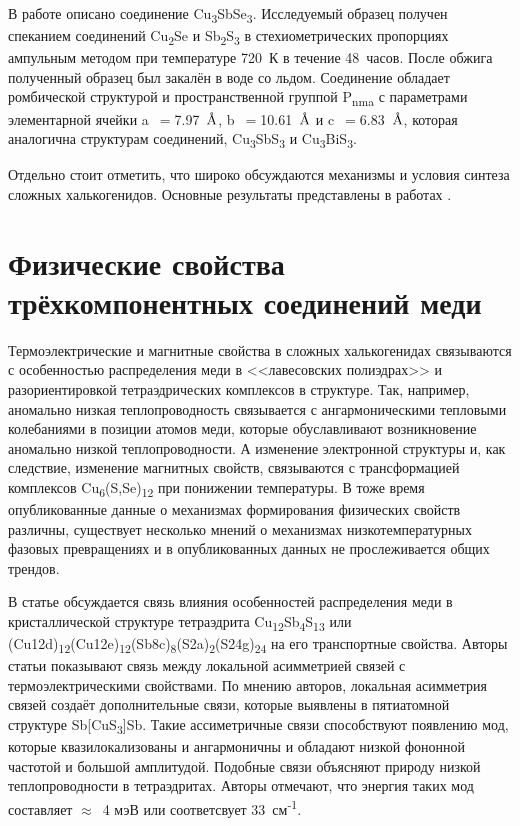 В работе \cite{31_Whitfield_1980} описано соединение Cu\textsubscript{3}SbSe\textsubscript{3}. Исследуемый образец получен спеканием соединений Cu\textsubscript{2}Se и Sb\textsubscript{2}S\textsubscript{3} в стехиометрических пропорциях ампульным методом при температуре 720~К в течение 48~часов. После обжига полученный образец был закалён в воде со льдом. Соединение обладает ромбической структурой и пространственной группой P\textsubscript{nma} с параметрами элементарной ячейки a~$=$7.97~$\mbox{\normalfont\AA}$, b~$=$10.61~$\mbox{\normalfont\AA}$ и c~$=$6.83~$\mbox{\normalfont\AA}$, которая аналогична структурам соединений,  Cu\textsubscript{3}SbS\textsubscript{3} и  Cu\textsubscript{3}BiS\textsubscript{3}.


Отдельно стоит отметить, что широко обсуждаются механизмы и условия синтеза сложных халькогенидов. Основные результаты представлены в работах \cite{Sis_Frost2002,sis_karup59new,sis_Mueller2002,sis_Mueller2003,sis_Raghavan2004,sis_seal1990tetrahedrite,sis_Skinner1972,sis_Taras_Bryndzia_1988,sis_Tomkins2006,sis1_1347-4065-8-4-443,sis1_BALAZ1995375,sis1_Braga2008,sis1_Pfitzner:se0205,sis1_WELLER2017794}.
\newpage


\section{Физические свойства трёхкомпонентных соединений меди} \label{sect1_3}

Термоэлектрические и магнитные свойства в сложных халькогенидах связываются с особенностью распределения меди в <<лавесовских полиэдрах>>  и разориентировкой тетраэдрических комплексов в структуре. Так, например, аномально низкая теплопроводность связывается с ангармоническими тепловыми колебаниями в позиции атомов меди\cite{Mishra2017}, которые обуславливают возникновение аномально низкой теплопроводности. А изменение электронной структуры и, как следствие, изменение магнитных свойств, связываются с трансформацией комплексов  Cu\textsubscript{6}(S,Se)\textsubscript{12} при понижении температуры\cite{Gainov2008}. В тоже время опубликованные данные о механизмах формирования физических свойств различны, существует несколько мнений о механизмах низкотемпературных фазовых превращениях и в опубликованных данных не прослеживается общих трендов.


В статье \cite{Lai_2015} обсуждается связь влияния особенностей распределения меди в кристаллической структуре тетраэдрита Cu\textsubscript{12}Sb\textsubscript{4}S\textsubscript{13} или (Cu12d)\textsubscript{12}(Cu12e)\textsubscript{12}(Sb8c)\textsubscript{8}(S2a)\textsubscript{2}(S24g)\textsubscript{24} на его транспортные свойства. Авторы статьи показывают связь между локальной асимметрией связей  с термоэлектрическими свойствами.  
По мнению авторов, локальная асимметрия связей создаёт дополнительные связи, которые выявлены в пятиатомной структуре Sb[CuS\textsubscript{3}]Sb. Такие ассиметричные связи способствуют появлению мод, которые квазилокализованы и ангармоничны и обладают низкой фононной частотой и большой амплитудой. Подобные связи объясняют природу низкой теплопроводности в тетраэдритах. Авторы отмечают, что энергия таких мод составляет $\approx$~4 мэВ или соответсвует 33~см\textsuperscript{-1}.

